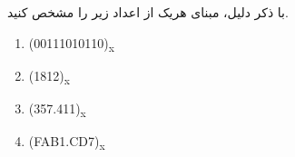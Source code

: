 با ذکر دلیل، مبنای هریک از اعداد زیر را مشخص کنید.

\begin{latin}
	\begin{enumerate}
		\item 
		(00111010110)\textsubscript{x}
		
		\item 
		(1812)\textsubscript{x}
		
		\item 
		(357.411)\textsubscript{x}
		
		\item 
		(FAB1.CD7)\textsubscript{x}
	\end{enumerate}
\end{latin}















%






%
